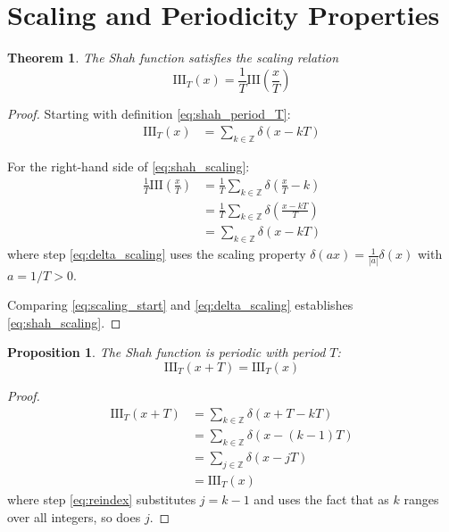 \documentclass{article}
\newtheorem{theorem}{Theorem}
\newtheorem{proposition}{Proposition}
\begin{document}
\section{Scaling and Periodicity Properties}

\begin{theorem}
\label{thm:shah_scaling}
The Shah function satisfies the scaling relation
\begin{equation}
\label{eq:shah_scaling}
\text{III}_T(x) = \frac{1}{T} \text{III}\left(\frac{x}{T}\right)
\end{equation}
\end{theorem}

\begin{proof}
Starting with definition \eqref{eq:shah_period_T}:
\begin{align}
\text{III}_T(x) &= \sum_{k \in \mathbb{Z}} \delta(x - kT) \label{eq:scaling_start}
\end{align}

For the right-hand side of \eqref{eq:shah_scaling}:
\begin{align}
\frac{1}{T} \text{III}\left(\frac{x}{T}\right) &= \frac{1}{T} \sum_{k \in \mathbb{Z}} \delta\left(\frac{x}{T} - k\right) \label{eq:scaling_rhs}\\
&= \frac{1}{T} \sum_{k \in \mathbb{Z}} \delta\left(\frac{x - kT}{T}\right) \label{eq:factor_out}\\
&= \sum_{k \in \mathbb{Z}} \delta(x - kT) \label{eq:delta_scaling}
\end{align}
where step \eqref{eq:delta_scaling} uses the scaling property $\delta(ax) = \frac{1}{|a|}\delta(x)$ with $a = 1/T > 0$.

Comparing \eqref{eq:scaling_start} and \eqref{eq:delta_scaling} establishes \eqref{eq:shah_scaling}.
\end{proof}

\begin{proposition}
\label{prop:shah_periodicity}
The Shah function is periodic with period $T$:
\begin{equation}
\label{eq:shah_periodic}
\text{III}_T(x + T) = \text{III}_T(x)
\end{equation}
\end{proposition}

\begin{proof}
\begin{align}
\text{III}_T(x + T) &= \sum_{k \in \mathbb{Z}} \delta(x + T - kT) \label{eq:period_shift}\\
&= \sum_{k \in \mathbb{Z}} \delta(x - (k-1)T) \label{eq:index_adjust}\\
&= \sum_{j \in \mathbb{Z}} \delta(x - jT) \label{eq:reindex}\\
&= \text{III}_T(x) \label{eq:period_result}
\end{align}
where step \eqref{eq:reindex} substitutes $j = k - 1$ and uses the fact that as $k$ ranges over all integers, so does $j$.
\end{proof}
\end{document}

